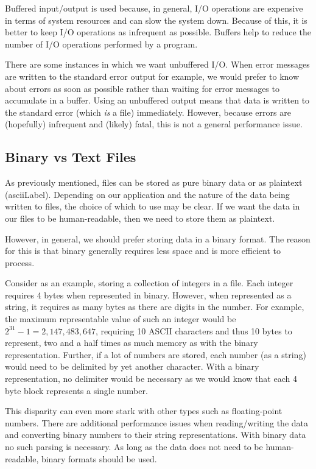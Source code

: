 Buffered input/output is used because, in general, I/O operations
are expensive in terms of system resources and can slow the system
down.  Because of this, it is better to keep I/O operations
as infrequent as possible.  Buffers help to reduce the number
of I/O operations performed by a program.  

There are some instances in which we want unbuffered I/O.
When error messages are written to the standard error output
for example, we would prefer to know about errors as soon 
as possible rather than waiting for error messages to accumulate
in a buffer.  Using an unbuffered output means that data
is written to the standard error (which \emph{is} a file) 
immediately.  However, because errors are (hopefully) infrequent
and (likely) fatal, this is not a general performance issue.

\subsection{Binary vs Text Files}

As previously mentioned, files can be stored as pure binary
data or as plaintext (\gls{asciiLabel}).  Depending on our
application and the nature of the data being written to files, 
the choice of which to use may be clear.  If we want the
data in our files to be human-readable, then we need
to store them as plaintext.  

However, in general, we should prefer storing data in a 
binary format.  The reason for this is that binary generally
requires less space and is more efficient to process.

Consider as an example, storing a collection of integers
in a file.  Each integer requires 4 bytes when represented
in binary.  However, when represented as a string, it
requires as many bytes as there are digits in the number.
For example, the maximum representable value of such an
integer would be $2^{31}-1 = 2,147,483,647$, requiring
10 ASCII characters and thus 10 bytes to represent, two
and a half times as much memory as with the binary 
representation.  Further, if a lot of numbers are stored, 
each number (as a string) would need to be delimited by
yet another character.  With a binary representation, 
no delimiter would be necessary as we would know that 
each 4 byte block represents a single number.

This disparity can even more stark with other types 
such as floating-point numbers.  There are additional
performance issues when reading/writing the data and
converting binary numbers to their string representations.
With binary data no such parsing is necessary. As long 
as the data does not need to be human-readable, binary
formats should be used.

